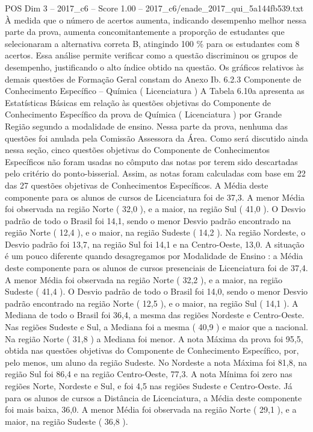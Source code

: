 \begin{textsample}{POS Dim 3 – 2017\_c6 – Score 1.00 – 2017\_c6/enade\_2017\_qui\_5a144fb539.txt}
À medida que o número de acertos aumenta, indicando desempenho melhor nessa parte da prova, aumenta concomitantemente a proporção de estudantes que selecionaram a alternativa correta B, atingindo 100 \% para os estudantes com 8 acertos.
Essa análise permite verificar como a questão discriminou os grupos de desempenho, justificando o alto índice obtido na questão.
Os gráficos relativos às demais questões de Formação Geral constam do Anexo Ib. 6.2.3 Componente de Conhecimento Específico – Química ( Licenciatura ) A Tabela 6.10a apresenta as Estatísticas Básicas em relação às questões objetivas do Componente de Conhecimento Específico da prova de Química ( Licenciatura ) por Grande Região segundo a modalidade de ensino.
Nessa parte da prova, nenhuma das questões foi anulada pela Comissão Assessora da Área.
Como será discutido ainda nessa seção, cinco questões objetivas do Componente de Conhecimentos Específicos não foram usadas no cômputo das notas por terem sido descartadas pelo critério do ponto-bisserial.
Assim, as notas foram calculadas com base em 22 das 27 questões objetivas de Conhecimentos Específicos.
A Média deste componente para os alunos de cursos de Licenciatura foi de 37,3.
A menor Média foi observada na região Norte ( 32,0 ), e a maior, na região Sul ( 41,0 ).
O Desvio padrão de todo o Brasil foi 14,1, sendo o menor Desvio padrão encontrado na região Norte ( 12,4 ), e o maior, na região Sudeste ( 14,2 ).
Na região Nordeste, o Desvio padrão foi 13,7, na região Sul foi 14,1 e na Centro-Oeste, 13,0.
A situação é um pouco diferente quando desagregamos por Modalidade de Ensino : a Média deste componente para os alunos de cursos presenciais de Licenciatura foi de 37,4.
A menor Média foi observada na região Norte ( 32,2 ), e a maior, na região Sudeste ( 41,4 ).
O Desvio padrão de todo o Brasil foi 14,0, sendo o menor Desvio padrão encontrado na região Norte ( 12,5 ), e o maior, na região Sul ( 14,1 ).
A Mediana de todo o Brasil foi 36,4, a mesma das regiões Nordeste e Centro-Oeste.
Nas regiões Sudeste e Sul, a Mediana foi a mesma ( 40,9 ) e maior que a nacional.
Na região Norte ( 31,8 ) a Mediana foi menor.
A nota Máxima da prova foi 95,5, obtida nas questões objetivas do Componente de Conhecimento Específico, por, pelo menos, um aluno da região Sudeste.
No Nordeste a nota Máxima foi 81,8, na região Sul foi 86,4 e na região Centro-Oeste, 77,3.
A nota Mínima foi zero nas regiões Norte, Nordeste e Sul, e foi 4,5 nas regiões Sudeste e Centro-Oeste.
Já para os alunos de cursos a Distância de Licenciatura, a Média deste componente foi mais baixa, 36,0.
A menor Média foi observada na região Norte ( 29,1 ), e a maior, na região Sudeste ( 36,8 ).

\end{textsample}
